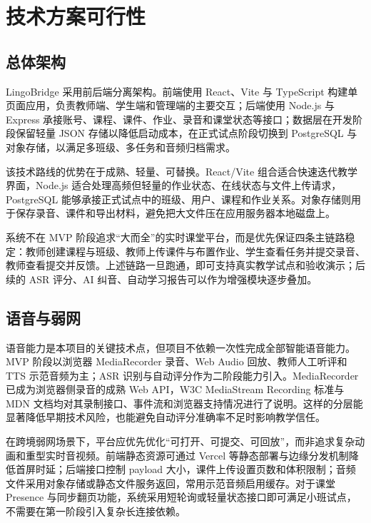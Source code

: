 \chapter{技术方案可行性}

\section{总体架构}
LingoBridge 采用前后端分离架构。前端使用 React、Vite 与 TypeScript 构建单页面应用，负责教师端、学生端和管理端的主要交互；后端使用 Node.js 与 Express 承接账号、课程、课件、作业、录音和课堂状态等接口；数据层在开发阶段保留轻量 JSON 存储以降低启动成本，在正式试点阶段切换到 PostgreSQL 与对象存储，以满足多班级、多任务和音频归档需求。

该技术路线的优势在于成熟、轻量、可替换。React/Vite 组合适合快速迭代教学界面，Node.js 适合处理高频但轻量的作业状态、在线状态与文件上传请求，PostgreSQL 能够承接正式试点中的班级、用户、课程和作业关系。对象存储则用于保存录音、课件和导出材料，避免把大文件压在应用服务器本地磁盘上。

系统不在 MVP 阶段追求“大而全”的实时课堂平台，而是优先保证四条主链路稳定：教师创建课程与班级、教师上传课件与布置作业、学生查看任务并提交录音、教师查看提交并反馈。上述链路一旦跑通，即可支持真实教学试点和验收演示；后续的 ASR 评分、AI 纠音、自动学习报告可以作为增强模块逐步叠加。

\section{语音与弱网}
语音能力是本项目的关键技术点，但项目不依赖一次性完成全部智能语音能力。MVP 阶段以浏览器 MediaRecorder 录音、Web Audio 回放、教师人工听评和 TTS 示范音频为主；ASR 识别与自动评分作为二阶段能力引入。MediaRecorder 已成为浏览器侧录音的成熟 Web API，W3C MediaStream Recording 标准与 MDN 文档均对其录制接口、事件流和浏览器支持情况进行了说明\cite{Ref-MediaRecorder,Ref-MDNMediaRecorder}。这样的分层能显著降低早期技术风险，也能避免自动评分准确率不足时影响教学信任。

在跨境弱网场景下，平台应优先优化“可打开、可提交、可回放”，而非追求复杂动画和重型实时音视频。前端静态资源可通过 Vercel 等静态部署与边缘分发机制降低首屏时延\cite{Ref-VercelDeployments}；后端接口控制 payload 大小，课件上传设置页数和体积限制；音频文件采用对象存储或静态文件服务返回，常用示范音频启用缓存。对于课堂 Presence 与同步翻页功能，系统采用短轮询或轻量状态接口即可满足小班试点，不需要在第一阶段引入复杂长连接依赖。

